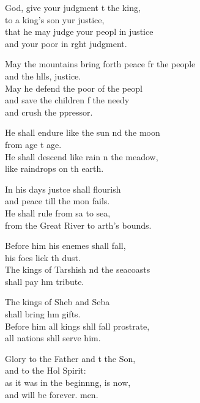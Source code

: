 \settowidth{\versewidth}{May the mountains bring forth peace for the people *}
\begin{psalmverse}%
  \begin{patverse}
 God, give your judgment t the king,\Med\\
to a king’s son yur justice,\\
that he may judge your peopl in justice\Med\\
and your poor in r\pointup{\i}ght judgment.

May the mountains bring forth peace fr the people\Med\\
and the h\pointup{\i}lls, justice.\\
May he defend the poor of the peopl\Flex\\
and save the children f the needy\Med\\
and crush the ppressor.

He shall endure like the sun nd the moon\Med\\
from age t age.\\
He shall descend like rain n the meadow,\Med\\
like raindrops on th earth.

In his days just\pointup{\i}ce shall flourish\Med\\
and peace till the mon fails.\\
He shall rule from sa to sea,\Med\\
from the Great River to arth’s bounds.

Before him his enem\pointup{\i}es shall fall,\Med\\
his foes lick th dust.\\
The kings of Tarshish nd the seacoasts\Med\\
shall pay h\pointup{\i}m tribute.

The kings of Sheb and Seba\Med\\
shall bring h\pointup{\i}m gifts.\\
Before him all kings shll fall prostrate,\Med\\
all nations shll serve him.

Glory to the Father and t the Son,\Med\\
and to the Hol Spirit:\\
as it was in the beginn\pointup{\i}ng, is now,\Med\\
and will be forever. men.
  \end{patverse}
\end{psalmverse}
